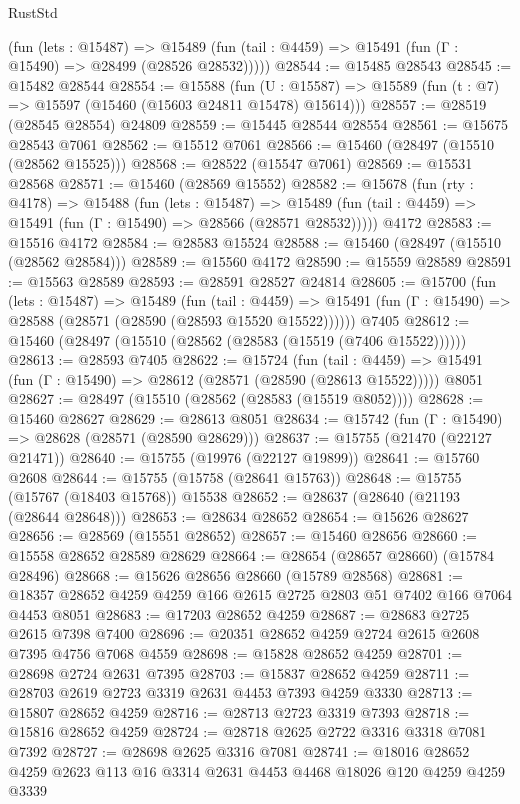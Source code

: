 \begin{lexlean}{RustStd}
\begin{coremodule}
      (fun (lets : @15487) =>
      @15489 (fun (tail : @4459) => @15491 (fun (Γ : @15490) => @28499 (@28526 @28532)))))
@28544 := @15485 @28543
@28545 := @15482 @28544
@28554 := @15588
    (fun (U : @15587) => @15589 (fun (t : @7) => @15597 (@15460 (@15603 @24811 @15478) @15614)))
@28557 := @28519 (@28545 @28554) @24809
@28559 := @15445 @28544 @28554
@28561 := @15675 @28543 @7061
@28562 := @15512 @7061
@28566 := @15460 (@28497 (@15510 (@28562 @15525)))
@28568 := @28522 (@15547 @7061)
@28569 := @15531 @28568
@28571 := @15460 (@28569 @15552)
@28582 := @15678
    (fun (rty : @4178) =>
    @15488
      (fun (lets : @15487) =>
      @15489 (fun (tail : @4459) => @15491 (fun (Γ : @15490) => @28566 (@28571 @28532)))))
    @4172
@28583 := @15516 @4172
@28584 := @28583 @15524
@28588 := @15460 (@28497 (@15510 (@28562 @28584)))
@28589 := @15560 @4172
@28590 := @15559 @28589
@28591 := @15563 @28589
@28593 := @28591 @28527 @24814
@28605 := @15700
    (fun (lets : @15487) =>
    @15489
      (fun (tail : @4459) =>
      @15491 (fun (Γ : @15490) => @28588 (@28571 (@28590 (@28593 @15520 @15522))))))
    @7405
@28612 := @15460 (@28497 (@15510 (@28562 (@28583 (@15519 (@7406 @15522))))))
@28613 := @28593 @7405
@28622 := @15724
    (fun (tail : @4459) => @15491 (fun (Γ : @15490) => @28612 (@28571 (@28590 (@28613 @15522)))))
    @8051
@28627 := @28497 (@15510 (@28562 (@28583 (@15519 @8052))))
@28628 := @15460 @28627
@28629 := @28613 @8051
@28634 := @15742 (fun (Γ : @15490) => @28628 (@28571 (@28590 @28629)))
@28637 := @15755 (@21470 (@22127 @21471))
@28640 := @15755 (@19976 (@22127 @19899))
@28641 := @15760 @2608
@28644 := @15755 (@15758 (@28641 @15763))
@28648 := @15755 (@15767 (@18403 @15768)) @15538
@28652 := @28637 (@28640 (@21193 (@28644 @28648)))
@28653 := @28634 @28652
@28654 := @15626 @28627
@28656 := @28569 (@15551 @28652)
@28657 := @15460 @28656
@28660 := @15558 @28652 @28589 @28629
@28664 := @28654 (@28657 @28660) (@15784 @28496)
@28668 := @15626 @28656 @28660 (@15789 @28568)
@28681 := @18357 @28652 @4259 @4259 @166 @2615 @2725 @2803 @51 @7402 @166 @7064 @4453 @8051
@28683 := @17203 @28652 @4259
@28687 := @28683 @2725 @2615 @7398 @7400
@28696 := @20351 @28652 @4259 @2724 @2615 @2608 @7395 @4756 @7068 @4559
@28698 := @15828 @28652 @4259
@28701 := @28698 @2724 @2631 @7395
@28703 := @15837 @28652 @4259
@28711 := @28703 @2619 @2723 @3319 @2631 @4453 @7393 @4259 @3330
@28713 := @15807 @28652 @4259
@28716 := @28713 @2723 @3319 @7393
@28718 := @15816 @28652 @4259
@28724 := @28718 @2625 @2722 @3316 @3318 @7081 @7392
@28727 := @28698 @2625 @3316 @7081
@28741 := @18016 @28652 @4259 @2623 @113 @16 @3314 @2631 @4453 @4468 @18026 @120 @4259 @4259 @3339

\end{coremodule}
\end{lexlean}
